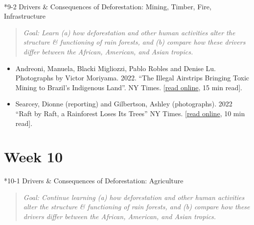 \documentclass[
  10pt,
  letterpaper,
  oneside,
  open=any]{scrbook}
\makeatletter
\let\oldparagraph\paragraph
\renewcommand{\paragraph}{
    \@ifstar
      \xxxParagraphStar
      \xxxParagraphNoStar
  }
\newcommand{\xxxParagraphStar}[1]{\oldparagraph*{#1}\mbox{}}
\newcommand{\xxxParagraphNoStar}[1]{\oldparagraph{#1}\mbox{}}
\makeatother
\begin{document}
\paragraph*{9-2 Drivers \& Consequences of Deforestation: Mining,
Timber, Fire,
Infrastructure}\label{drivers-consequences-of-deforestation-mining-timber-fire-infrastructure}

\begin{quote}
\emph{Goal: Learn (a) how deforestation and other human activities alter
the structure \& functioning of rain forests, and (b) compare how these
drivers differ between the African, American, and Asian tropics.}
\end{quote}

\begin{itemize}
\item
  Andreoni, Manuela, Blacki Migliozzi, Pablo Robles and Denise Lu.
  Photographs by Victor Moriyama. 2022. ``The Illegal Airstrips Bringing
  Toxic Mining to Brazil's Indigenous Land''. NY Times.
  {[}\href{https://www.nytimes.com/interactive/2022/08/02/world/americas/brazil-airstrips-illegal-mining.html}{read
  online}, 15 min read{]}.
\item
  Searcey, Dionne (reporting) and Gilbertson, Ashley (photographs). 2022
  ``Raft by Raft, a Rainforest Loses Its Trees'' NY Times.
  {[}\href{https://www.nytimes.com/interactive/2022/06/14/climate/congo-rainforest-logging.html}{read
  online}, 10 min read{]}.
\end{itemize}

\section*{Week 10}\label{week-10}


\paragraph*{10-1 Drivers \& Consequences of Deforestation:
Agriculture}\label{drivers-consequences-of-deforestation-agriculture}

\begin{quote}
\emph{Goal: Continue learning (a) how deforestation and other human
activities alter the structure \& functioning of rain forests, and (b)
compare how these drivers differ between the African, American, and
Asian tropics.}
\end{quote}
\end{document}
